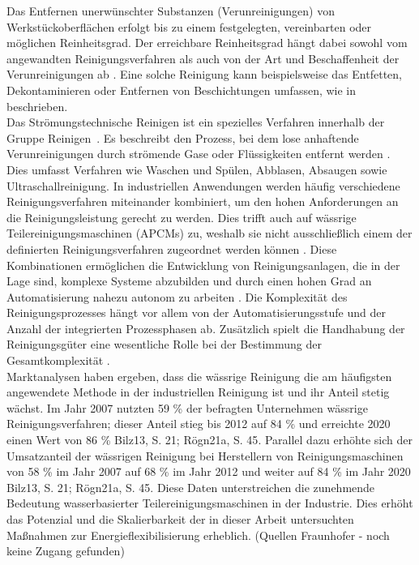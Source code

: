 Das Entfernen unerwünschter Substanzen (Verunreinigungen) von Werkstückoberflächen erfolgt bis zu einem festgelegten, vereinbarten oder möglichen Reinheitsgrad. Der erreichbare Reinheitsgrad hängt dabei sowohl vom angewandten Reinigungsverfahren als auch von der Art und Beschaffenheit der Verunreinigungen ab \cite{dindeutschesinstitutfurnormunge.v.FertigungsverfahrenReinigenEinordnungBeuthVerlagGmbH}. Eine solche Reinigung kann beispielsweise das Entfetten, Dekontaminieren oder Entfernen von Beschichtungen umfassen, wie in \cite{dindeutschesinstitutfurnormunge.v.FertigungsverfahrenReinigenEinordnungBeuthVerlagGmbH} beschrieben.\\

Das Strömungstechnische Reinigen ist ein spezielles Verfahren innerhalb der Gruppe \grqq Reinigen\glqq~. Es beschreibt den Prozess, bei dem lose anhaftende Verunreinigungen durch strömende Gase oder Flüssigkeiten entfernt werden \cite{dindeutschesinstitutfurnormunge.v.FertigungsverfahrenReinigenEinordnungBeuthVerlagGmbH}. Dies umfasst Verfahren wie Waschen und Spülen, Abblasen, Absaugen sowie Ultraschallreinigung. In industriellen Anwendungen werden häufig verschiedene Reinigungsverfahren miteinander kombiniert, um den hohen Anforderungen an die Reinigungsleistung gerecht zu werden. Dies trifft auch auf wässrige Teilereinigungsmaschinen (APCMs) zu, weshalb sie nicht ausschließlich einem der definierten Reinigungsverfahren zugeordnet werden können \cite{jungeBeitragZurEnergieeffizienzbewertung2019}. Diese Kombinationen ermöglichen die Entwicklung von Reinigungsanlagen, die in der Lage sind, komplexe Systeme abzubilden und durch einen hohen Grad an Automatisierung nahezu autonom zu arbeiten \cite{jungeBeitragZurEnergieeffizienzbewertung2019}. Die Komplexität des Reinigungsprozesses hängt vor allem von der Automatisierungsstufe und der Anzahl der integrierten Prozessphasen ab. Zusätzlich spielt die Handhabung der Reinigungsgüter eine wesentliche Rolle bei der Bestimmung der Gesamtkomplexität \cite{wullsteinAuswahlUndOptimale2004}.\\

Marktanalysen haben ergeben, dass die wässrige Reinigung die am häufigsten angewendete Methode in der industriellen Reinigung ist und ihr Anteil stetig wächst. Im Jahr 2007 nutzten 59 \% der befragten Unternehmen wässrige Reinigungsverfahren; dieser Anteil stieg bis 2012 auf 84 \% und erreichte 2020 einen Wert von 86 \% {Bilz13, S. 21; Rögn21a, S. 45}. Parallel dazu erhöhte sich der Umsatzanteil der wässrigen Reinigung bei Herstellern von Reinigungsmaschinen von 58 \% im Jahr 2007 auf 68 \% im Jahr 2012 und weiter auf 84 \% im Jahr 2020 {Bilz13, S. 21; Rögn21a, S. 45}. Diese Daten unterstreichen die zunehmende Bedeutung wasserbasierter Teilereinigungsmaschinen in der Industrie. Dies erhöht das Potenzial und die Skalierbarkeit der in dieser Arbeit untersuchten Maßnahmen zur Energieflexibilisierung erheblich. (Quellen Fraunhofer - noch keine Zugang gefunden)\\


